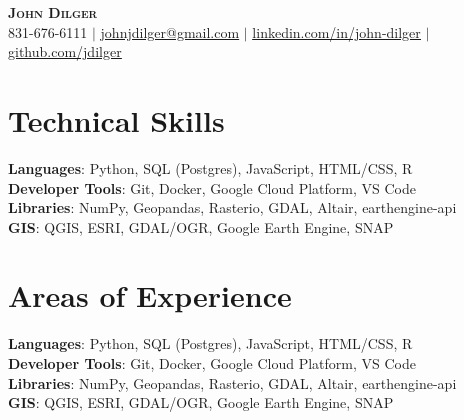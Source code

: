 \documentclass[letterpaper,11pt]{article}
\begin{document}

\begin{center}
    \textbf{\Huge \scshape John Dilger} \\ \vspace{1pt}
    \small 831-676-6111 $|$ \href{mailto:johnjdilger@gmail.com}{\underline{johnjdilger@gmail.com}} $|$ 
    \href{https://linkedin.com/in/john-dilger}{\underline{linkedin.com/in/john-dilger}} $|$
    \href{https://github.com/jdilger}{\underline{github.com/jdilger}}
\end{center}


\section{Technical Skills}
 \begin{itemize}[leftmargin=0.15in, label={}]
    \small{\item{
     \textbf{Languages}{: Python, SQL (Postgres), JavaScript, HTML/CSS, R} \\
     \textbf{Developer Tools}{: Git, Docker, Google Cloud Platform, VS Code} \\
     \textbf{Libraries}{: NumPy, Geopandas, Rasterio, GDAL, Altair, earthengine-api} \\
     \textbf{GIS}{: QGIS, ESRI, GDAL/OGR, Google Earth Engine, SNAP}
    }}
 \end{itemize}

 \section{Areas of Experience}
 \begin{itemize}[leftmargin=0.15in, label={}]
    \small{\item{
     \textbf{Languages}{: Python, SQL (Postgres), JavaScript, HTML/CSS, R} \\
     \textbf{Developer Tools}{: Git, Docker, Google Cloud Platform, VS Code} \\
     \textbf{Libraries}{: NumPy, Geopandas, Rasterio, GDAL, Altair, earthengine-api} \\
     \textbf{GIS}{: QGIS, ESRI, GDAL/OGR, Google Earth Engine, SNAP}
    }}
 \end{itemize}
\end{document}
